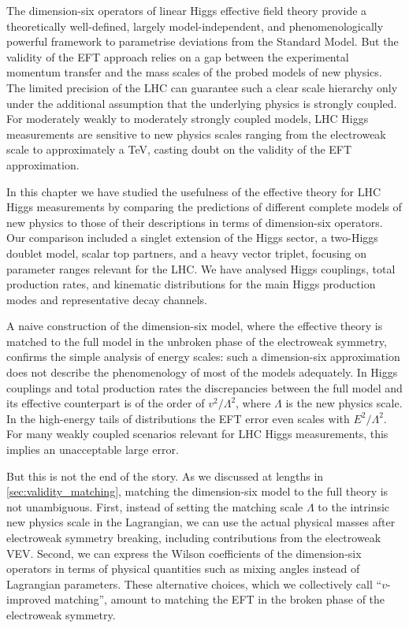 The dimension-six operators of linear Higgs effective field theory
provide a theoretically well-defined, largely model-independent, and
phenomenologically powerful framework to parametrise deviations from
the Standard Model. But the validity of the EFT approach relies on a
gap between the experimental momentum transfer and the mass scales of
the probed models of new physics. The limited precision of the LHC can
guarantee such a clear scale hierarchy only under the additional
assumption that the underlying physics is strongly coupled. For
moderately weakly to moderately strongly coupled models, LHC Higgs
measurements are sensitive to new physics scales ranging from the
electroweak scale to approximately a TeV, casting doubt on the
validity of the EFT approximation.

In this chapter we have studied the usefulness of the effective theory
for LHC Higgs measurements by comparing the predictions of different
complete models of new physics to those of their descriptions in terms
of dimension-six operators. Our comparison included a singlet
extension of the Higgs sector, a two-Higgs doublet model, scalar top
partners, and a heavy vector triplet, focusing on parameter ranges
relevant for the LHC. We have analysed Higgs couplings, total
production rates, and kinematic distributions for the main Higgs
production modes and representative decay channels.

A naive construction of the dimension-six model, where the effective
theory is matched to the full model in the unbroken phase of the
electroweak symmetry, confirms the simple analysis of energy scales:
such a dimension-six approximation does not describe the phenomenology
of most of the models adequately. In Higgs couplings and total
production rates the discrepancies between the full model and its
effective counterpart is of the order of $v^2 / \Lambda^2$, where
$\Lambda$ is the new physics scale. In the high-energy tails of
distributions the EFT error even scales with $E^2 / \Lambda^2$. For
many weakly coupled scenarios relevant for LHC Higgs measurements,
this implies an unacceptable large error.

But this is not the end of the story. As we discussed at lengths in
\autoref{sec:validity_matching}, matching the dimension-six model to
the full theory is not unambiguous. First, instead of setting the
matching scale $\Lambda$ to the intrinsic new physics scale in the
Lagrangian, we can use the actual physical masses after electroweak
symmetry breaking, including contributions from the electroweak
VEV. Second, we can express the Wilson coefficients of the
dimension-six operators in terms of physical quantities such as mixing
angles instead of Lagrangian parameters. These alternative choices,
which we collectively call ``$v$-improved matching'', amount to
matching the EFT in the broken phase of the electroweak symmetry.

